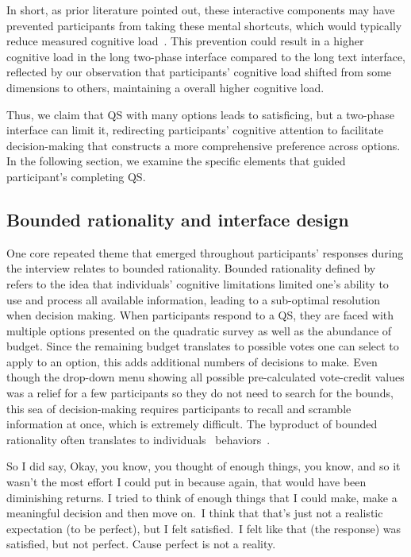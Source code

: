 In short, as prior literature pointed out, these interactive components may have prevented participants from taking these mental shortcuts, which would typically reduce measured cognitive load~\cite{daniel2017thinking, simonBehavioralModelRational1955, payneAdaptiveStrategySelection1988, tverskyJudgmentsRepresentativeness}. This prevention could result in a higher cognitive load in the long two-phase interface compared to the long text interface, reflected by our observation that participants' cognitive load shifted from some dimensions to others, maintaining a overall higher cognitive load.

Thus, we claim that QS with many options leads to satisficing, but a two-phase interface can limit it, redirecting participants' cognitive attention to facilitate decision-making that constructs a more comprehensive preference across options. In the following section, we examine the specific elements that guided participant's completing QS.


\subsection{Bounded rationality and interface design}
One core repeated theme that emerged throughout participants' responses during the interview relates to bounded rationality. Bounded rationality defined by~\textcite{simonBehavioralModelRational1955} refers to the idea that individuals' cognitive limitations limited one's ability to use and process all available information, leading to a sub-optimal resolution when decision making. When participants respond to a QS, they are faced with multiple options presented on the quadratic survey as well as the abundance of budget. Since the remaining budget translates to possible votes one can select to apply to an option, this adds additional numbers of decisions to make. Even though the drop-down menu showing all possible pre-calculated vote-credit values was a relief for a few participants so they do not need to search for the bounds, this sea of decision-making requires participants to recall and scramble information at once, which is extremely difficult. The byproduct of bounded rationality often translates to individuals~\underline{} behaviors~\cite{gigerenzerReasoningFastFrugal1996}.

\begin{displayquote}
So I did say, Okay, you know, you thought of enough things, you know, and so it wasn't the most effort I could put in because again, that would have been diminishing returns. I tried to think of enough things that I could make, make a meaningful decision and then move on.~\bracketellipsis I think that that's just not a realistic expectation (to be perfect), but I felt satisfied.~\bracketellipsis I felt like that (the response) was satisfied, but not perfect. Cause perfect is not a reality. \hfill{}
\end{displayquote}

